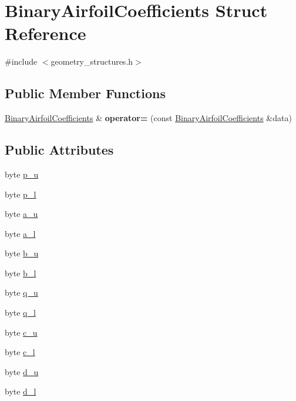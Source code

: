 \hypertarget{struct_binary_airfoil_coefficients}{}\section{Binary\+Airfoil\+Coefficients Struct Reference}
\label{struct_binary_airfoil_coefficients}


{\ttfamily \#include $<$geometry\+\_\+structures.\+h$>$}

\subsection*{Public Member Functions}
\begin{DoxyCompactItemize}
\item 
\hypertarget{struct_binary_airfoil_coefficients_a1a7fcb4d52f90f94d0fca535897a5428}{}\label{struct_binary_airfoil_coefficients_a1a7fcb4d52f90f94d0fca535897a5428} 
\hyperlink{struct_binary_airfoil_coefficients}{Binary\+Airfoil\+Coefficients} \& {\bfseries operator=} (const \hyperlink{struct_binary_airfoil_coefficients}{Binary\+Airfoil\+Coefficients} \&data)
\end{DoxyCompactItemize}
\subsection*{Public Attributes}
\begin{DoxyCompactItemize}
\item 
byte \hyperlink{struct_binary_airfoil_coefficients_adc5da813d292a991f0e038348ff26ae1}{p\+\_\+u}
\item 
byte \hyperlink{struct_binary_airfoil_coefficients_a9474385e776695d50b75914ff62bd37a}{p\+\_\+l}
\item 
byte \hyperlink{struct_binary_airfoil_coefficients_a2fd01b5ce7c9bef55ba5e30bd19c062a}{a\+\_\+u}
\item 
byte \hyperlink{struct_binary_airfoil_coefficients_a49511b7e8398b06d8d880c7576ab5311}{a\+\_\+l}
\item 
byte \hyperlink{struct_binary_airfoil_coefficients_adadc9038b8731917b4dbcabd776b6627}{b\+\_\+u}
\item 
byte \hyperlink{struct_binary_airfoil_coefficients_a3d553603f76f7b5ddc6febc3a70db3f3}{b\+\_\+l}
\item 
byte \hyperlink{struct_binary_airfoil_coefficients_a6ed8c98c3817a396756b2a16a0d4791b}{q\+\_\+u}
\item 
byte \hyperlink{struct_binary_airfoil_coefficients_af015cf807e794441f030791862b22adb}{q\+\_\+l}
\item 
byte \hyperlink{struct_binary_airfoil_coefficients_a9de0fabddae28b4d649a256c19137eb4}{c\+\_\+u}
\item 
byte \hyperlink{struct_binary_airfoil_coefficients_a0c5c811277770502ff707312b5289601}{c\+\_\+l}
\item 
byte \hyperlink{struct_binary_airfoil_coefficients_a9640283446988bbdb012e94aaf2a41a3}{d\+\_\+u}
\item 
byte \hyperlink{struct_binary_airfoil_coefficients_a8b911d241a95f63e79813747ba2c25e6}{d\+\_\+l}
\end{DoxyCompactItemize}


